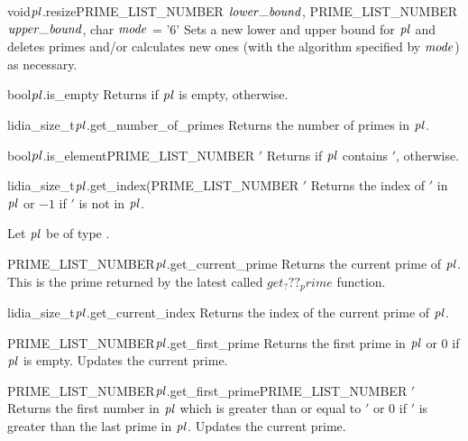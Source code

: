 \begin{fcode}{void}{$\mathit{pl}$.resize}{PRIME_LIST_NUMBER $\lowerbound$,
    PRIME_LIST_NUMBER $\upperbound$, char $\mathit{mode}$ = '6'}%
  Sets a new lower and upper bound for $\mathit{pl}$ and deletes primes and/or calculates new ones (with
  the algorithm specified by $\mathit{mode}$) as necessary.
\end{fcode}

\begin{cfcode}{bool}{$\mathit{pl}$.is_empty}{}
  Returns \TRUE if $\mathit{pl}$ is empty, \FALSE otherwise.
\end{cfcode}

\begin{cfcode}{lidia_size_t}{$\mathit{pl}$.get_number_of_primes}{}
  Returns the number of primes in $\mathit{pl}$.
\end{cfcode}

\begin{cfcode}{bool}{$\mathit{pl}$.is_element}{PRIME_LIST_NUMBER $\prime$}
  Returns \TRUE if $\mathit{pl}$ contains $\prime$, \FALSE otherwise.
\end{cfcode}

\begin{cfcode}{lidia_size_t}{$\mathit{pl}$.get_index(PRIME_LIST_NUMBER $\prime$}{}
  Returns the index of $\prime$ in $\mathit{pl}$ or $-1$ if $\prime$ is not in $\mathit{pl}$.
\end{cfcode}



\ACCS

Let $\mathit{pl}$ be of type .

\begin{cfcode}{PRIME_LIST_NUMBER}{$\mathit{pl}$.get_current_prime}{}
  Returns the current prime of $\mathit{pl}$.  This is the prime returned by the latest called
  $get_???_prime$ function.
\end{cfcode}

\begin{cfcode}{lidia_size_t}{$\mathit{pl}$.get_current_index}{}
  Returns the index of the current prime of $\mathit{pl}$.
\end{cfcode}

\begin{cfcode}{PRIME_LIST_NUMBER}{$\mathit{pl}$.get_first_prime}{}
  Returns the first prime in $\mathit{pl}$ or 0 if $\mathit{pl}$ is empty.  Updates the current prime.
\end{cfcode}

\begin{cfcode}{PRIME_LIST_NUMBER}{$\mathit{pl}$.get_first_prime}{PRIME_LIST_NUMBER $\prime$}
  Returns the first number in $\mathit{pl}$ which is greater than or equal to $\prime$ or 0 if $\prime$ is
  greater than the last prime in $\mathit{pl}$.  Updates the current prime.
\end{cfcode}

